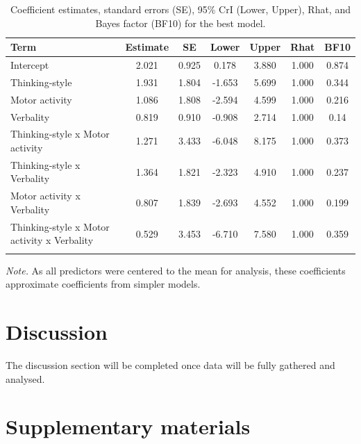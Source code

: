 \documentclass[a4paper,12pt,twoside,openright,oldfontcommands,final]{memoir}
\begin{document}
\begin{table}[H]
\begin{center}
\begin{threeparttable}
\caption{\label{tab:paramexp2panas}Coefficient estimates, standard errors (SE), 95\% CrI (Lower, Upper), Rhat, and Bayes factor (BF10) for the best model.}
\small{
\begin{tabular}{lcccccc}
\toprule
Term & \multicolumn{1}{c}{Estimate} & \multicolumn{1}{c}{SE} & \multicolumn{1}{c}{Lower} & \multicolumn{1}{c}{Upper} & \multicolumn{1}{c}{Rhat} & \multicolumn{1}{c}{BF10}\\
\midrule
Intercept & 2.021 & 0.925 & 0.178 & 3.880 & 1.000 & 0.874\\
Thinking-style & 1.931 & 1.804 & -1.653 & 5.699 & 1.000 & 0.344\\
Motor activity & 1.086 & 1.808 & -2.594 & 4.599 & 1.000 & 0.216\\
Verbality & 0.819 & 0.910 & -0.908 & 2.714 & 1.000 & 0.14\\
Thinking-style x Motor activity & 1.271 & 3.433 & -6.048 & 8.175 & 1.000 & 0.373\\
Thinking-style x Verbality & 1.364 & 1.821 & -2.323 & 4.910 & 1.000 & 0.237\\
Motor activity x Verbality & 0.807 & 1.839 & -2.693 & 4.552 & 1.000 & 0.199\\
Thinking-style x Motor activity x Verbality & 0.529 & 3.453 & -6.710 & 7.580 & 1.000 & 0.359\\
\bottomrule
\addlinespace
\end{tabular}
}
\begin{tablenotes}[para]
\textit{Note.} As all predictors were centered to the mean for analysis, these coefficients approximate coefficients from simpler models.
\end{tablenotes}
\end{threeparttable}
\end{center}
\end{table}

\hypertarget{discussion-4}{%
\section{Discussion}\label{discussion-4}}

The discussion section will be completed once data will be fully gathered and analysed.

\hypertarget{supp}{%
\section{Supplementary materials}\label{supp}}
\end{document}
